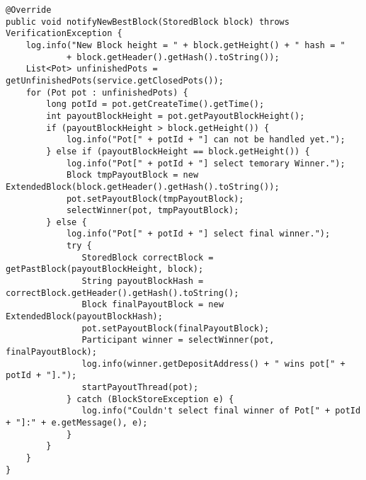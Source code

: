 \begin{lstlisting}[basicstyle=\small]
@Override
public void notifyNewBestBlock(StoredBlock block) throws VerificationException {
    log.info("New Block height = " + block.getHeight() + " hash = "
            + block.getHeader().getHash().toString());
    List<Pot> unfinishedPots = getUnfinishedPots(service.getClosedPots());
    for (Pot pot : unfinishedPots) {
        long potId = pot.getCreateTime().getTime();
        int payoutBlockHeight = pot.getPayoutBlockHeight();
        if (payoutBlockHeight > block.getHeight()) {
            log.info("Pot[" + potId + "] can not be handled yet.");
        } else if (payoutBlockHeight == block.getHeight()) {
            log.info("Pot[" + potId + "] select temorary Winner.");
            Block tmpPayoutBlock = new ExtendedBlock(block.getHeader().getHash().toString());
            pot.setPayoutBlock(tmpPayoutBlock);
            selectWinner(pot, tmpPayoutBlock);
        } else {
            log.info("Pot[" + potId + "] select final winner.");
            try {
               StoredBlock correctBlock = getPastBlock(payoutBlockHeight, block);
               String payoutBlockHash = correctBlock.getHeader().getHash().toString();
               Block finalPayoutBlock = new ExtendedBlock(payoutBlockHash);
               pot.setPayoutBlock(finalPayoutBlock);
               Participant winner = selectWinner(pot, finalPayoutBlock);
               log.info(winner.getDepositAddress() + " wins pot[" + potId + "].");
               startPayoutThread(pot);
            } catch (BlockStoreException e) {
               log.info("Couldn't select final winner of Pot[" + potId + "]:" + e.getMessage(), e);
            }
        }
    }
}
\end{lstlisting}


